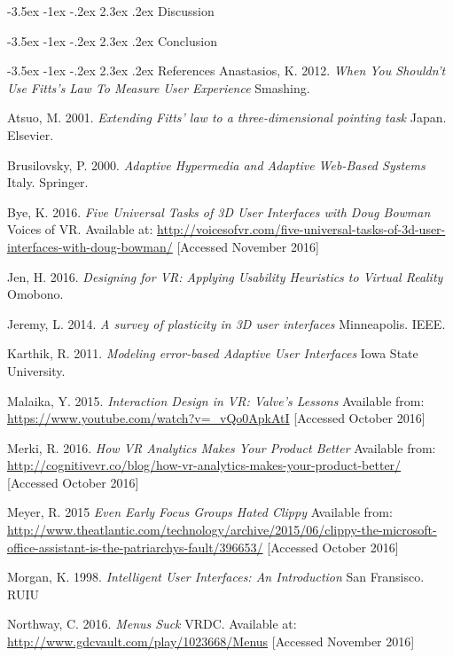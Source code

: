 \documentclass[11pt]{article}
\makeatletter
\renewcommand{\section}{\@startsection {section}{1}{\z@}%
             {-3.5ex \@plus -1ex \@minus -.2ex}%
             {2.3ex \@plus .2ex}%
             {\normalfont\Large\scshape\bfseries}}
\makeatother
\begin{document}
\section{Discussion}

\section{Conclusion}

\pagebreak

\section{References}
Anastasios, K. 2012. \emph{When You Shouldn't Use Fitts's Law To Measure User Experience} Smashing. 

Atsuo, M. 2001. \emph{Extending Fitts' law to a three-dimensional pointing task} Japan. Elsevier. 

Brusilovsky, P. 2000. \emph{Adaptive Hypermedia and Adaptive Web-Based Systems} Italy. Springer.

Bye, K. 2016. \emph{Five Universal Tasks of 3D User Interfaces with Doug Bowman} Voices of VR. Available at: \url{http://voicesofvr.com/five-universal-tasks-of-3d-user-interfaces-with-doug-bowman/} [Accessed November 2016]

Jen, H. 2016. \emph{Designing for VR: Applying Usability Heuristics to Virtual Reality} Omobono. 

Jeremy, L. 2014. \emph{A survey of plasticity in 3D user interfaces} Minneapolis. IEEE. 

Karthik, R. 2011. \emph{Modeling error-based Adaptive User Interfaces} Iowa State University. 

Malaika, Y. 2015. \emph{Interaction Design in VR: Valve's Lessons } Available from: \url{https://www.youtube.com/watch?v=_vQo0ApkAtI} [Accessed October 2016]

Merki, R. 2016. \emph{How VR Analytics Makes Your Product Better} Available from: \url{http://cognitivevr.co/blog/how-vr-analytics-makes-your-product-better/} [Accessed October 2016]

Meyer, R. 2015 \emph{Even Early Focus Groups Hated Clippy} Available from: \url{http://www.theatlantic.com/technology/archive/2015/06/clippy-the-microsoft-office-assistant-is-the-patriarchys-fault/396653/} [Accessed October 2016]

Morgan, K. 1998. \emph{Intelligent User Interfaces: An Introduction} San Fransisco. RUIU 

Northway, C. 2016. \emph{Menus Suck} VRDC. Available at: \url{http://www.gdcvault.com/play/1023668/Menus} [Accessed November 2016]
\end{document}
